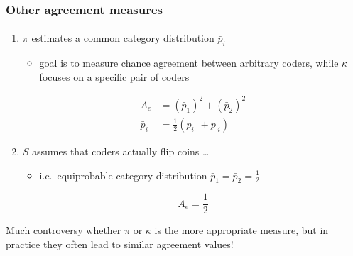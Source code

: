 \documentclass[t]{beamer} %
\begin{document}
\begin{frame}
  \frametitle{Other agreement measures}
  \framesubtitle{\citep{Scott:55,Bennett:Alpert:Goldstein:54}}

  \begin{enumerate}
  \item $\pi$ estimates a common category distribution $\bar{p}_i$
    \begin{itemize}
    \item goal is to measure chance agreement between arbitrary coders,
      while $\kappa$ focuses on a specific pair of coders
    \end{itemize}
    \begin{align*}
      A_e &= (\bar{p}_1)^2 + (\bar{p}_2)^2 \\
      \bar{p}_i &= \tfrac{1}{2} (p_{i\cdot} + p_{\cdot i})
    \end{align*}
  \item<2-> $S$ assumes that coders actually flip coins \ldots
    \begin{itemize}
    \item i.e.\ equiprobable category distribution $\bar{p}_1 = \bar{p}_2 = \frac{1}{2}$
    \end{itemize}
    \[
    A_e = \frac{1}{2}
    \]
  \end{enumerate}

  \ungap[1]
  Much controversy whether $\pi$ or $\kappa$ is the more appropriate measure,
  but in practice they often lead to similar agreement values!
\end{frame}
\end{document}
